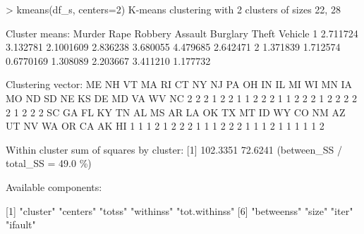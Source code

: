 \documentclass[
]{article}
\newenvironment{Shaded}{\begin{snugshade}}{\end{snugshade}}
\newcommand{\AttributeTok}[1]{\textcolor[rgb]{0.77,0.63,0.00}{#1}}
\newcommand{\DecValTok}[1]{\textcolor[rgb]{0.00,0.00,0.81}{#1}}
\newcommand{\FloatTok}[1]{\textcolor[rgb]{0.00,0.00,0.81}{#1}}
\newcommand{\FunctionTok}[1]{\textcolor[rgb]{0.00,0.00,0.00}{#1}}
\newcommand{\NormalTok}[1]{#1}
\newcommand{\SpecialCharTok}[1]{\textcolor[rgb]{0.00,0.00,0.00}{#1}}
\newcommand{\StringTok}[1]{\textcolor[rgb]{0.31,0.60,0.02}{#1}}
\begin{document}
\begin{Shaded}
\begin{Highlighting}[]
\SpecialCharTok{\textgreater{}} \FunctionTok{kmeans}\NormalTok{(df\_s, }\AttributeTok{centers=}\DecValTok{2}\NormalTok{)}
\NormalTok{K}\SpecialCharTok{{-}}\NormalTok{means clustering with }\DecValTok{2}\NormalTok{ clusters of sizes }\DecValTok{22}\NormalTok{, }\DecValTok{28}

\NormalTok{Cluster means}\SpecialCharTok{:}
\NormalTok{    Murder     Rape   Robbery  Assault Burglary    Theft  Vehicle}
\DecValTok{1} \FloatTok{2.711724} \FloatTok{3.132781} \FloatTok{2.1001609} \FloatTok{2.836238} \FloatTok{3.680055} \FloatTok{4.479685} \FloatTok{2.642471}
\DecValTok{2} \FloatTok{1.371839} \FloatTok{1.712574} \FloatTok{0.6770169} \FloatTok{1.308089} \FloatTok{2.203667} \FloatTok{3.411210} \FloatTok{1.177732}

\NormalTok{Clustering vector}\SpecialCharTok{:}
\NormalTok{ME NH VT MA RI CT NY NJ PA OH IN IL MI WI MN IA MO ND SD NE KS DE MD VA WV NC }
 \DecValTok{2}  \DecValTok{2}  \DecValTok{2}  \DecValTok{1}  \DecValTok{2}  \DecValTok{2}  \DecValTok{1}  \DecValTok{1}  \DecValTok{2}  \DecValTok{2}  \DecValTok{2}  \DecValTok{1}  \DecValTok{1}  \DecValTok{2}  \DecValTok{2}  \DecValTok{2}  \DecValTok{1}  \DecValTok{2}  \DecValTok{2}  \DecValTok{2}  \DecValTok{2}  \DecValTok{2}  \DecValTok{1}  \DecValTok{2}  \DecValTok{2}  \DecValTok{2} 
\NormalTok{SC GA FL KY TN AL MS AR LA OK TX MT ID WY CO NM AZ UT NV WA OR CA AK HI }
 \DecValTok{1}  \DecValTok{1}  \DecValTok{1}  \DecValTok{2}  \DecValTok{1}  \DecValTok{2}  \DecValTok{2}  \DecValTok{2}  \DecValTok{1}  \DecValTok{1}  \DecValTok{1}  \DecValTok{2}  \DecValTok{2}  \DecValTok{2}  \DecValTok{1}  \DecValTok{1}  \DecValTok{1}  \DecValTok{2}  \DecValTok{1}  \DecValTok{1}  \DecValTok{1}  \DecValTok{1}  \DecValTok{1}  \DecValTok{2} 

\NormalTok{Within cluster sum of squares by cluster}\SpecialCharTok{:}
\NormalTok{[}\DecValTok{1}\NormalTok{] }\FloatTok{102.3351}  \FloatTok{72.6241}
\NormalTok{ (between\_SS }\SpecialCharTok{/} \AttributeTok{total\_SS =}  \FloatTok{49.0}\NormalTok{ \%)}

\NormalTok{Available components}\SpecialCharTok{:}

\NormalTok{[}\DecValTok{1}\NormalTok{] }\StringTok{"cluster"}      \StringTok{"centers"}      \StringTok{"totss"}        \StringTok{"withinss"}     \StringTok{"tot.withinss"}
\NormalTok{[}\DecValTok{6}\NormalTok{] }\StringTok{"betweenss"}    \StringTok{"size"}         \StringTok{"iter"}         \StringTok{"ifault"}      
\end{Highlighting}
\end{Shaded}
\end{document}
